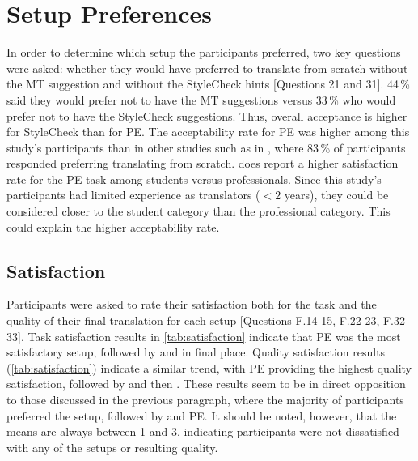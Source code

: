 
\section{Setup Preferences}
\label{sec:setup_prefs}

\noindent In order to determine which setup the participants preferred, two key questions were asked: whether they would have preferred to translate from scratch without the \ac{MT} suggestion and without the StyleCheck hints [Questions 21 and 31]. 44\,\% said they would prefer not to have the \ac{MT} suggestions versus 33\,\% who would prefer not to have the StyleCheck suggestions. Thus, overall acceptance is higher for StyleCheck than for \ac{PE}. The acceptability rate for \ac{PE} was higher among this study's participants than in other studies such as in \textcite{carl2015post}, where 83\,\% of participants responded preferring translating from scratch. \textcite{carl2015post} does report a higher satisfaction rate for the \ac{PE} task among students versus professionals. Since this study's participants had limited experience as translators ($<2$ years), they could be considered closer to the student category than the professional category. This could explain the higher acceptability rate.

\subsection{Satisfaction}

\noindent Participants were asked to rate their satisfaction both for the task and the quality of their final translation for each setup [Questions F.14-15, F.22-23, F.32-33]. Task satisfaction results in \autoref{tab:satisfaction} indicate that \ac{PE} was the most satisfactory setup, followed by \scratch and \style in final place. Quality satisfaction results (\autoref{tab:satisfaction}) indicate a similar trend, with \ac{PE} providing the highest quality satisfaction, followed by \style and then . These results seem to be in direct opposition to those discussed in the previous paragraph, where the majority of participants preferred the \scratch setup, followed by \style and \ac{PE}. It should be noted, however, that the means are always between 1 and 3, indicating participants were not dissatisfied with any of the setups or resulting quality.

